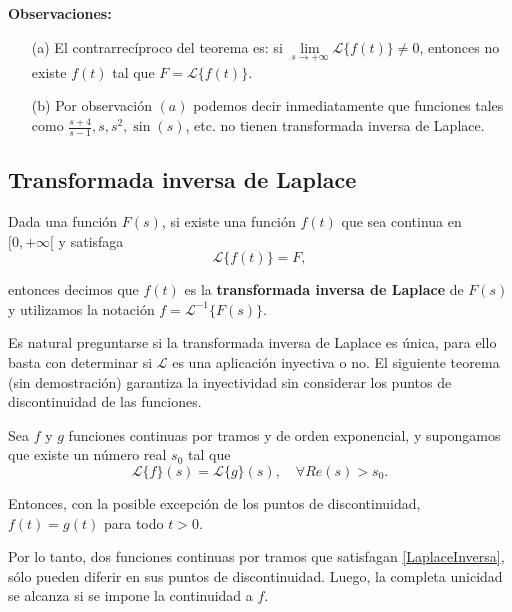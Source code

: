 \textbf{Observaciones:}

\begin{itemize}
\item[(a)] El contrarrecíproco del teorema es: si $\lim\limits_{s \to + \infty} \mathcal{L}\{f(t)\} \neq 0$, entonces no existe $f(t)$ tal que $F = \mathcal{L}\{f(t)\}$.

\item[(b)] Por observación $(a)$ podemos decir inmediatamente que funciones tales como $\frac{s+4}{s-1}, s, s^2, \sin(s)$, etc. no tienen transformada inversa de Laplace.
\end{itemize} 

\subsection{Transformada inversa de Laplace}

\begin{defi}
Dada una función $F(s)$, si existe una función $f(t)$ que sea continua en $[0, + \infty[$ y satisfaga
\begin{equation}
\mathcal{L}\{f(t)\} = F, \label{LaplaceInversa}
\end{equation}

entonces decimos que $f(t)$ es la \textbf{transformada inversa de Laplace} de $F(s)$ y utilizamos la notación $f = \mathcal{L}^{-1} \{F(s)\}$.
\end{defi}

Es natural preguntarse si la transformada inversa de Laplace es única, para ello basta con determinar si $\mathcal{L}$ es una aplicación inyectiva o no. El siguiente teorema (sin demostración) garantiza la inyectividad sin considerar los puntos de discontinuidad de las funciones.

\begin{teorema}[de Lerch]
 Sea $f$ y $g$ funciones continuas por tramos y de orden exponencial, y supongamos que existe un número real $s_0$ tal que
\begin{equation*}
\mathcal{L}\{f\}(s) = \mathcal{L}\{g\}(s), \quad \forall Re(s) >s_0.
\end{equation*}

Entonces, con la posible excepción de los puntos de discontinuidad, $f(t) = g(t)$ para todo $t >0$.
\end{teorema}

Por lo tanto, dos funciones continuas por tramos que satisfagan \eqref{LaplaceInversa}, sólo pueden diferir en sus puntos de discontinuidad. Luego, la completa unicidad se alcanza si se impone la continuidad a $f$.

